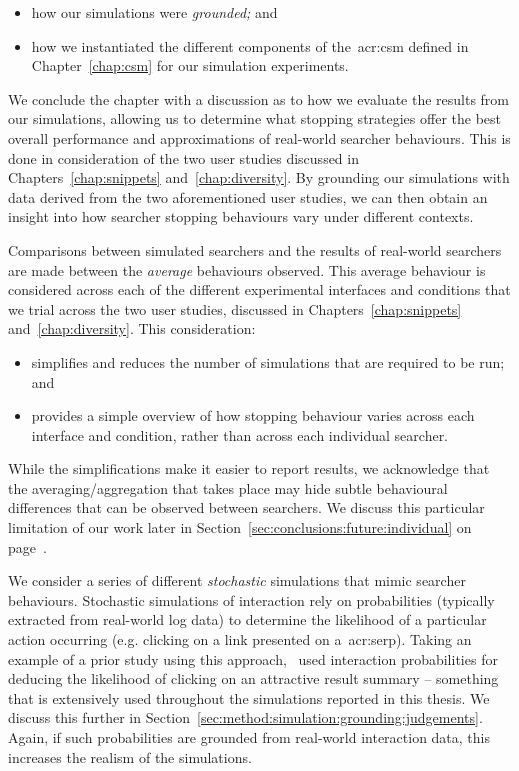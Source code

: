 \begin{itemize}
    \item{how our simulations were \emph{grounded;} and}
    \item{how we instantiated the different components of the~\gls{acr:csm} defined in Chapter~\ref{chap:csm} for our simulation experiments.}
\end{itemize}

We conclude the chapter with a discussion as to how we evaluate the results from our simulations, allowing us to determine what stopping strategies offer the best overall performance and approximations of real-world searcher behaviours. This is done in consideration of the two user studies discussed in Chapters~\ref{chap:snippets} and~\ref{chap:diversity}. By grounding our simulations with data derived from the two aforementioned user studies, we can then obtain an insight into how searcher stopping behaviours vary under different contexts.

 Comparisons between simulated searchers and the results of real-world searchers are made between the \emph{average} behaviours observed. This average behaviour is considered across each of the different experimental interfaces and conditions that we trial across the two user studies, discussed in Chapters~\ref{chap:snippets} and~\ref{chap:diversity}. This consideration:

\begin{itemize}
    \item{simplifies and reduces the number of simulations that are required to be run; and}
    \item{provides a simple overview of how stopping behaviour varies across each interface and condition, rather than across each individual searcher.}
\end{itemize}

While the simplifications make it easier to report results, we acknowledge that the averaging/aggregation that takes place may hide subtle behavioural differences that can be observed between searchers. We discuss this particular limitation of our work later in Section~\ref{sec:conclusions:future:individual} on page~\pageref{sec:conclusions:future:individual}.

 We consider a series of different \emph{stochastic} simulations that mimic searcher behaviours. Stochastic simulations of interaction rely on probabilities (typically extracted from real-world log data) to determine the likelihood of a particular action occurring (e.g. clicking on a link presented on a~\gls{acr:serp}). Taking an example of a prior study using this approach,~\cite{yilmaz2010browsing_utility} used interaction probabilities for deducing the likelihood of clicking on an attractive result summary -- something that is extensively used throughout the simulations reported in this thesis. We discuss this further in Section~\ref{sec:method:simulation:grounding:judgements}. Again, if such probabilities are grounded from real-world interaction data, this increases the realism of the simulations.

